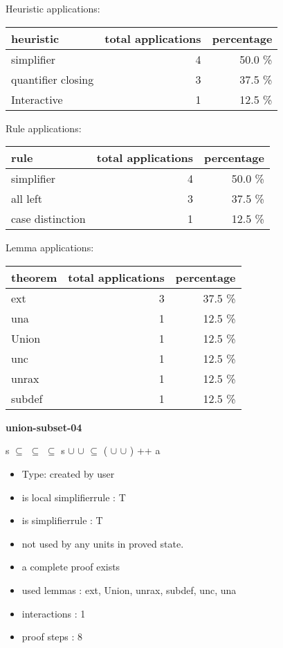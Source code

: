 \documentclass[a4paper]{article}
\begin{document}
\medskip


Heuristic applications:

\begin{supertabular}{l|r|r}
heuristic	& total applications & percentage \\ \hline
simplifier & 4 & 50.0 \% \\
quantifier closing & 3 & 37.5 \% \\
Interactive & 1 & 12.5 \% \\

\end{supertabular}

Rule applications:

\begin{supertabular}{l|r|r}
rule	        & total applications & percentage \\ \hline
simplifier & 4 & 50.0 \% \\
all left & 3 & 37.5 \% \\
case distinction & 1 & 12.5 \% \\

\end{supertabular}

Lemma applications:

\begin{supertabular}{l|r|r}
theorem	        & total applications & percentage \\ \hline
ext & 3 & 37.5 \% \\
una & 1 & 12.5 \% \\
Union & 1 & 12.5 \% \\
unc & 1 & 12.5 \% \\
unrax & 1 & 12.5 \% \\
subdef & 1 & 12.5 \% \\

\end{supertabular}
\pagebreak

{\LARGE\bf union-subset-04}\label{lemma-union-subset-04}

\medskip

 \Fol s $\subseteq$  \And {} $\subseteq$  \And {} $\subseteq$  \Imp s $\cup$  $\cup$  $\subseteq$ ( $\cup$  $\cup$ ) ++ a

\begin{itemize}

\item Type: created by user

\item is local simplifierrule : T
\item is simplifierrule : T
\item not used by any units in proved state.
\item       a complete proof exists
\item       used lemmas  : ext, Union, unrax, subdef, unc, una
\item       interactions : 1
\item       proof steps  : 8
\end{itemize}
\end{document}
